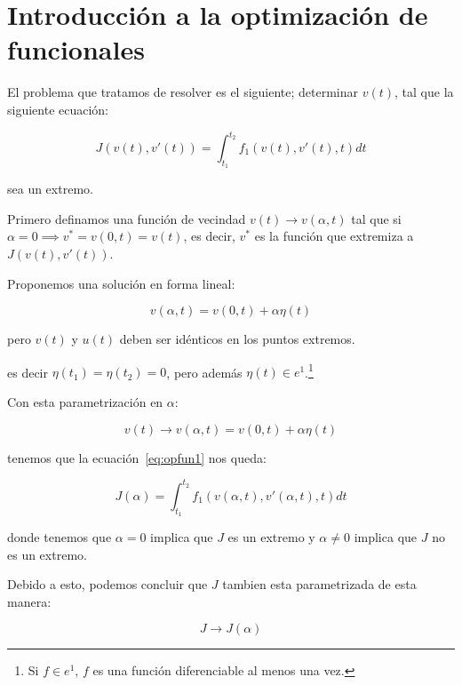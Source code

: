 
\chapter{Introducción a la optimización de funcionales}

    El problema que tratamos de resolver es el siguiente; determinar $v(t)$, tal que la siguiente ecuación:

    \begin{equation} \label{eq:opfun1}
        J(v(t), v'(t)) = \int_{t_1}^{t_2} f_1(v(t), v'(t), t) dt
    \end{equation}

    sea un extremo.

    Primero definamos una función de vecindad $v(t) \to v(\alpha, t)$ tal que si $\alpha = 0 \implies v^* = v(0, t) = v(t)$, es decir, $v^*$ es la función que extremiza a $J(v(t), v'(t))$.

    Proponemos una solución en forma lineal:

    \begin{equation}
        v(\alpha, t) = v(0, t) + \alpha \eta(t)
    \end{equation}

    pero $v(t)$ y $u(t)$ deben ser idénticos en los puntos extremos.


    es decir $\eta(t_1) = \eta(t_2) = 0$, pero además $\eta(t) \in e^1$.\footnote{Si $f \in e^1$, $f$ es una función diferenciable al menos una vez.}

    Con esta parametrización en $\alpha$:

    \begin{equation*}
        v(t) \to v(\alpha, t) = v(0, t) + \alpha \eta(t)
    \end{equation*}

    tenemos que la ecuación~\ref{eq:opfun1} nos queda:

    \begin{equation*}
        J(\alpha) = \int_{t_1}^{t_2} f_1(v(\alpha, t), v'(\alpha, t), t) dt
    \end{equation*}

    donde tenemos que $\alpha = 0$ implica que $J$ es un extremo y $\alpha \ne 0$ implica que $J$ no es un extremo.

    Debido a esto, podemos concluir que $J$ tambien esta parametrizada de esta manera:

    \begin{equation*}
        J \to J(\alpha)
    \end{equation*}


